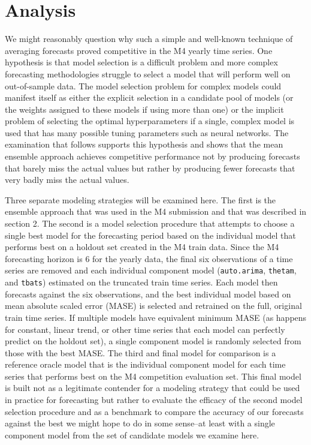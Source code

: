 \documentclass[11pt,3p,review,authoryear]{elsarticle}
\begin{document}
\section{Analysis}
We might reasonably question why such a simple and well-known technique of averaging forecasts proved competitive in the M4 yearly time series. One hypothesis is that model selection is a difficult problem and more complex forecasting methodologies struggle to select a model that will perform well on out-of-sample data. The model selection problem for complex models could manifest itself as either the explicit selection in a candidate pool of models (or the weights assigned to these models if using more than one) or the implicit problem of selecting the optimal hyperparameters if a single, complex model is used that has many possible tuning parameters such as neural networks. The examination that follows supports this hypothesis and shows that the mean ensemble approach achieves competitive performance not by producing forecasts that barely miss the actual values but rather by producing fewer forecasts that very badly miss the actual values.


Three separate modeling strategies will be examined here. The first is the ensemble approach that was used in the M4 submission and that was described in section 2. The second is a model selection procedure that attempts to choose a single best model for the forecasting period based on the individual model that performs best on a holdout set created in the M4 train data. Since the M4 forecasting horizon is 6 for the yearly data, the final six observations of a time series are removed and each individual component model (\texttt{auto.arima}, \texttt{thetam}, and \texttt{tbats}) estimated on the truncated train time series. Each model then forecasts against the six observations, and the best individual model based on mean absolute scaled error (MASE) is selected and retrained on the full, original train time series. If multiple models have equivalent minimum MASE (as happens for constant, linear trend, or other time series that each model can perfectly predict on the holdout set), a single component model is randomly selected from those with the best MASE. The third and final model for comparison is a reference oracle model that is the individual component model for each time series that performs best on the M4 competition evaluation set. This final model is built not as a legitimate contender for a modeling strategy that could be used in practice for forecasting but rather to evaluate the efficacy of the second model selection procedure and as a benchmark to compare the accuracy of our forecasts against the best we might hope to do in some sense--at least with a single component model from the set of candidate models we examine here.
\end{document}
